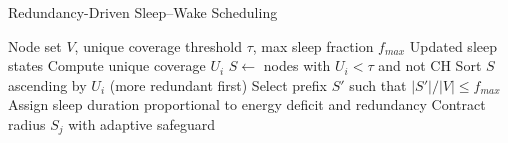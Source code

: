 \begin{algorithm}[ht]
\caption{Redundancy-Driven Sleep--Wake Scheduling}\label{alg:sleep-wake}
\begin{algorithmic}[1]
\Require Node set $V$, unique coverage threshold $\tau$, max sleep fraction $f_{max}$
\Ensure Updated sleep states
  \State Compute unique coverage $U_i$
\EndFor
\State $S \gets$ nodes with $U_i < \tau$ and not CH
\State Sort $S$ ascending by $U_i$ (more redundant first)
\State Select prefix $S'$ such that $|S'|/|V| \le f_{max}$
  \State Assign sleep duration proportional to energy deficit and redundancy
\EndFor
{}
  \State Contract radius $S_j$ with adaptive safeguard
\EndFor
\end{algorithmic}
\end{algorithm}
